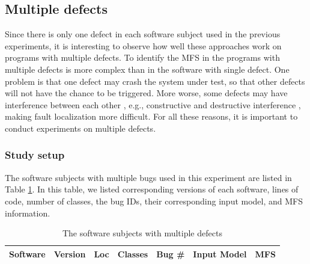 \documentclass[10pt,journal,compsoc]{IEEEtran}
\begin{document}
%
%
%


{\color{blue}\subsection{Multiple defects}
Since there is only one defect in each software subject used in the previous experiments, it is interesting to observe how well these approaches work on programs with multiple defects. To identify the MFS in the programs with multiple defects is more complex than in the software with single defect. One problem is that one defect may crash the system under test, so that other defects will not have the chance to be triggered. More worse, some defects may have interference between each other \cite{wong2016survey}, e.g., constructive and destructive interference \cite{debroy2009insights}, making fault localization more difficult.  For all these reasons, it is important to conduct experiments on multiple defects.

\subsubsection{Study setup}
The software subjects with multiple bugs used in this experiment are listed in Table \ref{multiple_defects_subjects}. In this table, we listed corresponding versions of each software, lines of code, number of classes, the bug IDs, their corresponding input model, and MFS information.

\begin{table}[ht]
\caption{The software subjects with multiple defects}
\label{multiple_defects_subjects}
\centering
\begin{tabular}{|c|c|c|c|c|c|c|} \hline
Software&  Version & Loc & Classes & Bug \# & Input Model & MFS\\ \hline


\end{tabular}
\end{table}}
\end{document}
